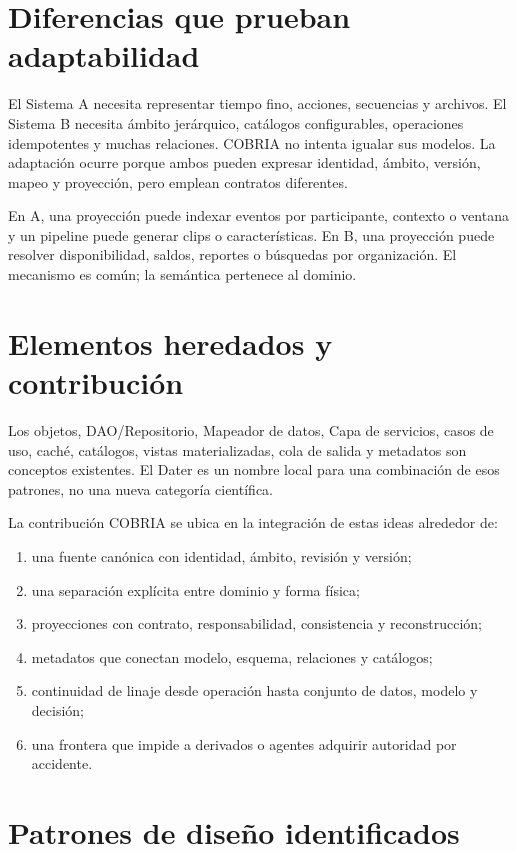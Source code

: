 \section{Diferencias que prueban adaptabilidad}

El Sistema A necesita representar tiempo fino, acciones, secuencias y archivos. El
Sistema B necesita ámbito jerárquico, catálogos configurables, operaciones idempotentes y
muchas relaciones. COBRIA no intenta igualar sus modelos. La adaptación ocurre porque
ambos pueden expresar identidad, ámbito, versión, mapeo y proyección, pero emplean
contratos diferentes.

En A, una proyección puede indexar eventos por participante, contexto o ventana y un
pipeline puede generar clips o características. En B, una proyección puede resolver
disponibilidad, saldos, reportes o búsquedas por organización. El mecanismo es común; la
semántica pertenece al dominio.

\section{Elementos heredados y contribución}

Los objetos, DAO/Repositorio, Mapeador de datos, Capa de servicios, casos de uso, caché, catálogos,
vistas materializadas, cola de salida y metadatos son conceptos existentes. El Dater es un nombre
local para una combinación de esos patrones, no una nueva categoría científica.

La contribución COBRIA se ubica en la integración de estas ideas alrededor de:

\begin{enumerate}[leftmargin=*]
  \item una fuente canónica con identidad, ámbito, revisión y versión;
  \item una separación explícita entre dominio y forma física;
  \item proyecciones con contrato, responsabilidad, consistencia y reconstrucción;
  \item metadatos que conectan modelo, esquema, relaciones y catálogos;
  \item continuidad de linaje desde operación hasta conjunto de datos, modelo y decisión;
  \item una frontera que impide a derivados o agentes adquirir autoridad por accidente.
\end{enumerate}

\section{Patrones de diseño identificados}

